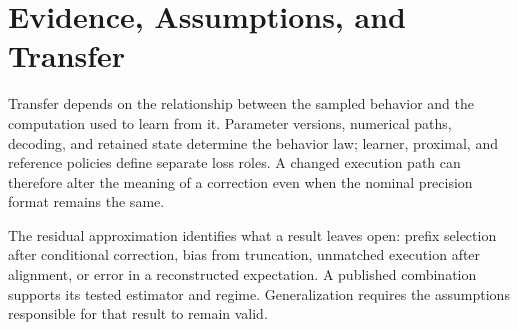 \section{Evidence, Assumptions, and Transfer}\label{app:checklist}
Transfer depends on the relationship between the sampled behavior and the computation used to learn from it. Parameter versions, numerical paths, decoding, and retained state determine the behavior law; learner, proximal, and reference policies define separate loss roles. A changed execution path can therefore alter the meaning of a correction even when the nominal precision format remains the same.

The residual approximation identifies what a result leaves open: prefix selection after conditional correction, bias from truncation, unmatched execution after alignment, or error in a reconstructed expectation. A published combination supports its tested estimator and regime. Generalization requires the assumptions responsible for that result to remain valid.


\clearpage
